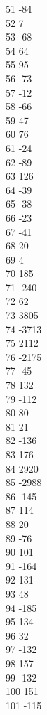 { 51	-84 \\
 52	7 \\
 53	-68 \\
 54	64 \\
 55	95 \\
 56	-73 \\
 57	-12 \\
 58	-66 \\
 59	47 \\
 60	76 \\
 61	-24 \\
 62	-89 \\
 63	126 \\
 64	-39 \\
 65	-38 \\
 66	-23 \\
 67	-41 \\
 68	20 \\
 69	4 \\
 70	185 \\
 71	-240 \\
 72	62 \\
 73	3805 \\
 74	-3713 \\
 75	2112 \\
 76	-2175 \\
 77	-45 \\
 78	132 \\
 79	-112 \\
 80	80 \\
 81	21 \\
 82	-136 \\
 83	176 \\
 84	2920 \\
 85	-2988 \\
 86	-145 \\
 87	114 \\
 88	20 \\
 89	-76 \\
 90	101 \\
 91	-164 \\
 92	131 \\
 93	48 \\
 94	-185 \\
 95	134 \\
 96	32 \\
 97	-132 \\
 98	157 \\
 99	-132 \\
 100	151 \\
 101	-115 \\
}
